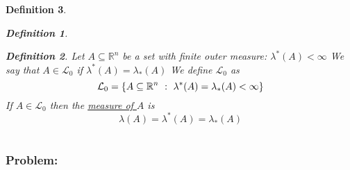 \documentclass[]{article}
\newcommand{\R}{\mathbb{R}}
\newcommand{\st}{\ : \ }
\newtheorem{definition}{Definition}
\newtheorem{theorem}{Theorem}
\begin{document}
\begin{definition}
\begin{enumerate}
\begin{definition}
            \end{definition}
            \begin{definition}
                Let $A\subseteq \R^n$ be a set with finite outer measure: 
                    $\lambda^*(A) < \infty$
                We say that $A \in \mathcal{L}_0$ if $\lambda^*(A) = \lambda_*(A)$
                We define $\mathcal{L}_0$ as \[
                    \mathcal{L}_0 = \qty{
                        A \subseteq \R^n \st \lambda^*(A) = \lambda_*(A) < \infty
                    }
                \] If $A \in \mathcal{L}_0$ then the \emph{\underline{measure of $A$}} is \[
                    \lambda(A) = \lambda^*(A) = \lambda_*(A)
                \]
            \end{definition}
    \end{enumerate}
\end{definition}










\newpage
\section{}
\subsection{}
\subsubsection*{Problem:}

        
\end{document}
